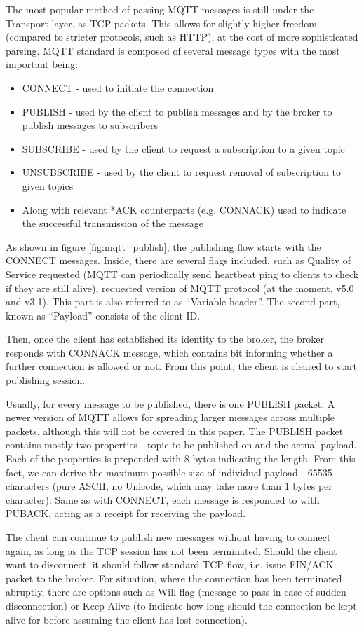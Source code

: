 The most popular method of passing MQTT messages is still under the Transport layer, as TCP packets. This allows for slightly higher freedom (compared to stricter protocols, such as HTTP), at the cost of more sophisticated parsing. MQTT standard is composed of several message types with the most important being:
\begin{itemize}
  \item CONNECT - used to initiate the connection
  \item PUBLISH - used by the client to publish messages and by the broker to publish messages to subscribers
  \item SUBSCRIBE - used by the client to request a subscription to a given topic
  \item UNSUBSCRIBE - used by the client to request removal of subscription to given topics
  \item Along with relevant *ACK counterparts (e.g. CONNACK) used to indicate the successful transmission of the message
\end{itemize}
As shown in figure \ref{fig:mqtt_publish}, the publishing flow starts with the CONNECT messages. Inside, there are several flags included, such as Quality of Service requested (MQTT can periodically send heartbeat ping to clients to check if they are still alive), requested version of MQTT protocol (at the moment, v5.0 and v3.1). This part is also referred to as ``Variable header''. The second part, known as ``Payload'' consists of the client ID.

Then, once the client has established its identity to the broker, the broker responds with CONNACK message, which contains bit informing whether a further connection is allowed or not. From this point, the client is cleared to start publishing session.

Usually, for every message to be published, there is one PUBLISH packet. A newer version of MQTT allows for spreading larger messages across multiple packets, although this will not be covered in this paper. The PUBLISH packet contains mostly two properties - topic to be published on and the actual payload. Each of the properties is prepended with 8 bytes indicating the length. From this fact, we can derive the maximum possible size of individual payload - 65535 characters (pure ASCII, no Unicode, which may take more than 1 bytes per character). Same as with CONNECT, each message is responded to with PUBACK, acting as a receipt for receiving the payload.

The client can continue to publish new messages without having to connect again, as long as the TCP session has not been terminated. Should the client want to disconnect, it should follow standard TCP flow, i.e. issue FIN/ACK packet to the broker. For situation, where the connection has been terminated abruptly, there are options such as Will flag (message to pass in case of sudden disconnection) or Keep Alive (to indicate how long should the connection be kept alive for before assuming the client has lost connection).

